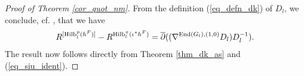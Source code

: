 \documentclass[12pt]{article}
\numberwithin{equation}{section}
\theoremstyle{theorem}
\theoremstyle{definition}
\theoremstyle{remark}
\newtheorem{rem}[thm]{Remark}
\newcommand{\enmr}[1]{\text{End}{(#1)}}
\newcommand{\dbar}{ \overline{\partial} }
\begin{document}
	\begin{proof}[Proof of Theorem \ref{cor_quot_nm}]
		From the definition (\ref{eq_defn_dk}) of $D_l$, we conclude, cf. \cite[(1.9.1)]{SiuLectures}, that we have
		\begin{equation}\label{eq_siu_ident}
			R^{[{\rm{Hilb}}_l^p(h^F)]} - R^{{\rm{Hilb}}_l^{\pi}(\iota^* h^F)}
			=
			\dbar( (\nabla^{\enmr{G_l}, (1, 0)} D_l) D_l^{-1}).
		\end{equation}		 
		The result now follows directly from Theorem \ref{thm_dk_as} and (\ref{eq_siu_ident}).
	\end{proof}

	
	
\end{document}
